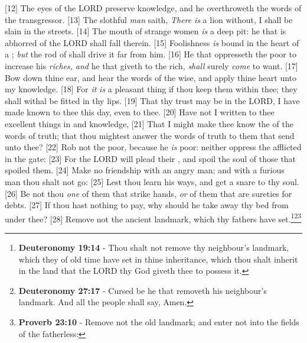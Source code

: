 [12] \textcolor[cmyk]{0.99998,1,0,0}{The eyes of the LORD preserve knowledge, and he overthroweth the words of the transgressor.}
[13] \textcolor[cmyk]{0.99998,1,0,0}{The slothful \emph{man} saith, \emph{There} \emph{is} a lion without, I shall be slain in the streets.}
[14] \textcolor[cmyk]{0.99998,1,0,0}{The mouth of strange women \emph{is} a deep pit: he that is abhorred of the LORD shall fall therein.}
[15] \textcolor[cmyk]{0.99998,1,0,0}{Foolishness \emph{is} bound in the heart of a ; \emph{but} the rod of  shall drive it far from him.}
[16] \textcolor[cmyk]{0.99998,1,0,0}{He that oppresseth the poor to increase his \emph{riches,} \emph{and} he that giveth to the rich, \emph{shall} surely \emph{come} to want.}
[17] \textcolor[cmyk]{0.99998,1,0,0}{Bow down thine ear, and hear the words of the wise, and apply thine heart unto my knowledge.}
[18] \textcolor[cmyk]{0.99998,1,0,0}{For \emph{it} \emph{is} a pleasant thing if thou keep them within thee; they shall withal be fitted in thy lips.}
[19] \textcolor[cmyk]{0.99998,1,0,0}{That thy trust may be in the LORD, I have made known to thee this day, even to thee.}
[20] \textcolor[cmyk]{0.99998,1,0,0}{Have not I written to thee excellent things in  and knowledge,}
[21] \textcolor[cmyk]{0.99998,1,0,0}{That I might make thee know the  of the words of truth; that thou mightest answer the words of truth to them that send unto thee?}
[22] \textcolor[cmyk]{0.99998,1,0,0}{Rob not the poor, because he \emph{is} poor: neither oppress the afflicted in the gate:}
[23] \textcolor[cmyk]{0.99998,1,0,0}{For the LORD will plead their , and spoil the soul of those that spoiled them.}
[24] \textcolor[cmyk]{0.99998,1,0,0}{Make no friendship with an angry man; and with a furious man thou shalt not go:}
[25] \textcolor[cmyk]{0.99998,1,0,0}{Lest thou learn his ways, and get a snare to thy soul.}
[26] \textcolor[cmyk]{0.99998,1,0,0}{Be not thou \emph{one} of them that strike hands, \emph{or} of them that are sureties for debts.}
[27] \textcolor[cmyk]{0.99998,1,0,0}{If thou hast nothing to pay, why should he take away thy bed from under thee?}
[28] \textcolor[cmyk]{0.99998,1,0,0}{Remove not the ancient landmark, which thy fathers have set.}\footnote{\textbf{Deuteronomy 19:14} - Thou shalt not remove thy neighbour’s landmark, which they of old time have set in thine inheritance, which thou shalt inherit in the land that the LORD thy God giveth thee to possess it.}\footnote{\textbf{Deuteronomy 27:17} - Cursed be he that removeth his neighbour’s landmark. And all the people shall say, Amen.}\footnote{\textbf{Proverb 23:10} - Remove not the old landmark; and enter not into the fields of the fatherless:}
